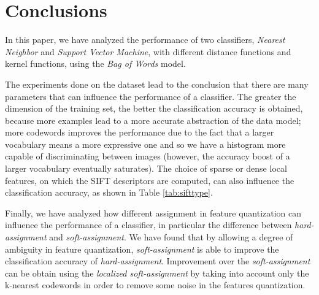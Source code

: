 \section{Conclusions}

In this paper, we have analyzed the performance of two classifiers, \emph{Nearest Neighbor} and \emph{Support Vector Machine}, with different distance functions and kernel functions, using the \emph{Bag of Words} model. 

The experiments done on the dataset lead to the conclusion that there are many parameters that can influence the performance of a classifier.
The greater the dimension of the training set, the better the classification accuracy is obtained, because more examples lead to a more accurate abstraction of the data model; more codewords improves the performance due to the fact that a larger vocabulary means a more expressive one and so we have a histogram more capable of discriminating between images (however, the accuracy boost of a larger vocabulary eventually saturates\cite{Philbin08lostin}). The choice of sparse or dense local features, on which the SIFT descriptors are computed, can also influence the classification accuracy, as shown in Table \ref{tab:sifttype}.

Finally, we have analyzed how different assignment in feature quantization can influence the performance of a classifier, in particular the difference between \emph{hard-assignment} and \emph{soft-assignment}.
We have found that by allowing a degree of ambiguity in feature quantization, \emph{soft-assignment} is able to improve the classification accuracy of \emph{hard-assignment}. Improvement over the \emph{soft-assignment} can be obtain using the \emph{localized soft-assignment} by taking into account only the k-nearest codewords in order to remove some noise in the features quantization.